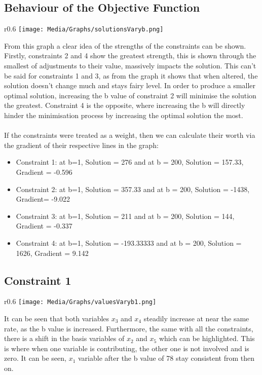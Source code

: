 \documentclass{article}
\numberwithin{equation}{section}
\begin{document}
\subsection{Behaviour of the Objective Function}
\begin{wrapfigure}{r}{0.6\textwidth}
    \centering
    \texttt{[image: Media/Graphs/solutionsVaryb.png]}
\end{wrapfigure}
From this graph a clear idea of the strengths of the constraints can be shown. Firstly, constraints 2 and 4 show the greatest strength, this is shown through the smallest of adjustments to their value, massively impacts the solution. This can't be said for constraints 1 and 3, as from the graph it shows that when altered, the solution doesn't change much and stays fairy level. In order to produce a smaller optimal solution, increasing the b value of constraint 2 will minimise the solution the greatest. Constraint 4 is the opposite, where increasing the b will directly hinder the minimisation process by increasing the optimal solution the most. \\ \\
If the constraints were treated as a weight, then we can calculate their worth via the gradient of their respective lines in the graph:
\begin{itemize}
    \item Constraint 1: at b=1, Solution = 276 and at b = 200, Solution = 157.33,    Gradient = -0.596
    \item Constraint 2: at b=1, Solution = 357.33 and at b = 200, Solution = -1438, Gradient= -9.022
    \item Constraint 3: at b=1, Solution = 211 and at b = 200, Solution = 144, Gradient = -0.337
    \item Constraint 4: at b=1, Solution = -193.33333 and at b = 200, Solution = 1626, Gradient = 9.142
\end{itemize}
\subsection{Constraint 1}
\begin{wrapfigure}{r}{0.6\textwidth}
    \centering
    \texttt{[image: Media/Graphs/valuesVaryb1.png]}
\end{wrapfigure}
It can be seen that both variables $x_3$ and $x_4$ steadily increase at near the same rate, as the b value is increased. Furthermore, the same with all the constraints, there is a shift in the basis variables of $x_2$ and $x_5$ which can be highlighted. This is where when one variable is contributing, the other one is not involved and is zero. It can be seen, $x_1$ variable after the b value of 78 stay consistent from then on. 
\newpage
\end{document}
